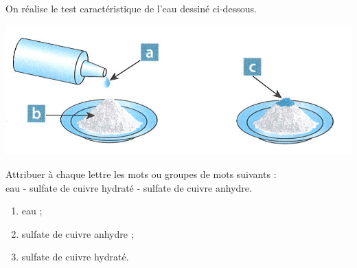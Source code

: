 \documentclass[a4paper,11pt]{exam}
\begin{document}
On réalise le test caractéristique de l'eau dessiné ci-dessous.

\begin{center}
	\includegraphics[scale=1]{schema}
\end{center}


\begin{questions}
	\question Attribuer à chaque lettre les mots ou groupes de mots suivants : \\
	eau - sulfate de cuivre hydraté - sulfate de cuivre anhydre.
	\begin{solution}
		\begin{enumerate}[label=\alph*.]
			\item eau ;
			\item sulfate de cuivre anhydre ;
			\item sulfate de cuivre hydraté.
		\end{enumerate}
	\end{solution}
\end{questions}


\ \label{LastPage}
\end{document}
